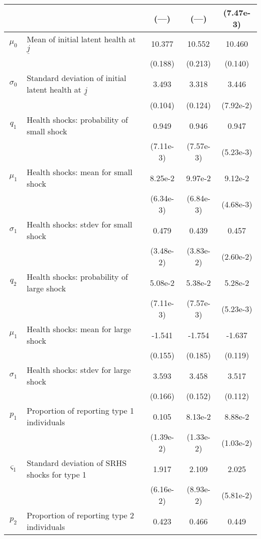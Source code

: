 \begin{table}
\begin{center}
{\begin{tabular}{clccc}
\rule{0pt}{2.2ex} & & (---) & (---) & (7.47e-3) \\
\hline
\rule{0pt}{2.2ex}$\mu_0$ & Mean of initial latent health at $\underline{j}$ & 10.377 & 10.552 & 10.460 \\
\rule{0pt}{2.2ex} & & (0.188) & (0.213) & (0.140) \\
\rule{0pt}{2.2ex}$\sigma_0$ & Standard deviation of initial latent health at $\underline{j}$ & 3.493 & 3.318 & 3.446 \\
\rule{0pt}{2.2ex} & & (0.104) & (0.124) & (7.92e-2) \\
\rule{0pt}{2.2ex}$q_1$ & Health shocks: probability of small shock & 0.949 & 0.946 & 0.947 \\
\rule{0pt}{2.2ex} & & (7.11e-3) & (7.57e-3) & (5.23e-3) \\
\rule{0pt}{2.2ex}$\mu_1$ & Health shocks: mean for small shock & 8.25e-2 & 9.97e-2 & 9.12e-2 \\
\rule{0pt}{2.2ex} & & (6.34e-3) & (6.84e-3) & (4.68e-3) \\
\rule{0pt}{2.2ex}$\sigma_1$ & Health shocks: stdev for small shock & 0.479 & 0.439 & 0.457 \\
\rule{0pt}{2.2ex} & & (3.48e-2) & (3.83e-2) & (2.60e-2) \\
\rule{0pt}{2.2ex}$q_2$ & Health shocks: probability of large shock & 5.08e-2 & 5.38e-2 & 5.28e-2 \\
\rule{0pt}{2.2ex} & & (7.11e-3) & (7.57e-3) & (5.23e-3) \\
\rule{0pt}{2.2ex}$\mu_1$ & Health shocks: mean for large shock & -1.541 & -1.754 & -1.637 \\
\rule{0pt}{2.2ex} & & (0.155) & (0.185) & (0.119) \\
\rule{0pt}{2.2ex}$\sigma_1$ & Health shocks: stdev for large shock & 3.593 & 3.458 & 3.517 \\
\rule{0pt}{2.2ex} & & (0.166) & (0.152) & (0.112) \\
\hline
\rule{0pt}{2.2ex}$p_1$ & Proportion of reporting type 1 individuals & 0.105 & 8.13e-2 & 8.88e-2 \\
\rule{0pt}{2.2ex} & & (1.39e-2) & (1.33e-2) & (1.03e-2) \\
\rule{0pt}{2.2ex}$\varsigma_1$ & Standard deviation of SRHS shocks for type 1 & 1.917 & 2.109 & 2.025 \\
\rule{0pt}{2.2ex} & & (6.16e-2) & (8.93e-2) & (5.81e-2) \\
\rule{0pt}{2.2ex}$p_2$ & Proportion of reporting type 2 individuals & 0.423 & 0.466 & 0.449 \\

\end{tabular}}
\end{center}
\end{table}
